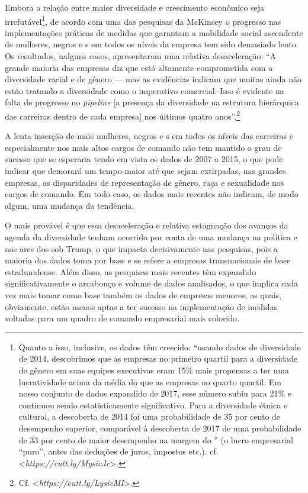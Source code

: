 Embora a relação entre maior diversidade e crescimento econômico seja
irrefutável\footnote{Quanto a isso, inclusive, os dados têm crescido:
  ``usando dados de diversidade de 2014, descobrimos que as empresas no
  primeiro quartil para a diversidade de gênero em suas equipes
  executivas eram 15\% mais propensas a ter uma lucratividade acima da
  média do que as empresas no quarto quartil. Em nosso conjunto de dados
  expandido de 2017, esse número subiu para 21\% e continuou sendo
  estatisticamente significativo. Para a diversidade étnica e cultural,
  a descoberta de 2014 foi uma probabilidade de 35 por cento de
  desempenho superior, comparável à descoberta de 2017 de uma
  probabilidade de 33 por cento de maior desempenho na margem do ''
  (o lucro empresarial ``puro'', antes das deduções de juros, impostos
  etc.). cf.
  \textless{}\emph{https://cutt.ly/MysicJc}\textgreater{}.},
de acordo com uma das pesquisas da McKinsey o progresso nas
implementações práticas de medidas que garantam a mobilidade social
ascendente de mulheres, negros e s em todos os níveis da empresa tem
sido demasiado lento. Os resultados, nalguns casos, apresentaram uma
relativa desaceleração: ``A grande maioria das empresas diz que está
altamente comprometida com a diversidade racial e de gênero --- mas as
evidências indicam que muitas ainda não estão tratando a diversidade
como o imperativo comercial. Isso é evidente na falta de progresso no
\emph{pipeline} {[}a presença da diversidade na estrutura hierárquica
das carreiras dentro de cada empresa{]} nos últimos quatro
anos''.\footnote{Cf. \textless{}\emph{https://cutt.ly/LysivMI}\textgreater{}.}

A lenta inserção de mais mulheres, negros e s em todos os níveis das
carreiras e especialmente nos mais altos cargos de comando não tem
mantido o grau de sucesso que se esperaria tendo em vista os dados de
2007 a 2015, o que pode indicar que demorará um tempo maior até que
sejam extirpadas, nas grandes empresas, as disparidades de representação
de gênero, raça e sexualidade nos cargos de comando. Em todo caso, os
dados mais recentes não indicam, de modo algum, uma mudança da
tendência.

O mais provável é que essa desaceleração e relativa estagnação dos
avanços da agenda da diversidade tenham ocorrido por conta de uma
mudança na política e nos ares dos  sob Trump, o que impacta
decisivamente nas pesquisas, pois a maioria dos dados toma por base e se
refere a empresas transnacionais de base estadunidense. Além disso, as
pesquisas mais recentes têm expandido significativamente o arcabouço e
volume de dados analisados, o que implica cada vez mais tomar como base
também os dados de empresas menores, as quais, obviamente, estão menos
aptas a ter sucesso na implementação de medidas voltadas para um quadro
de comando empresarial mais colorido.

